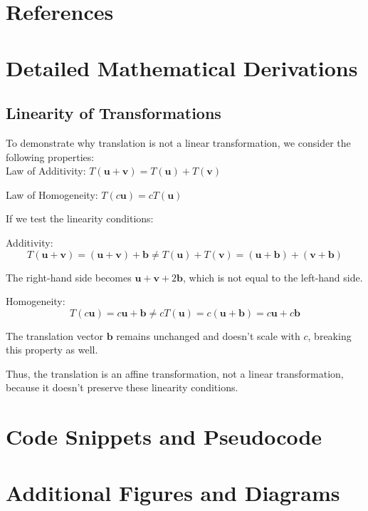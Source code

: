 \documentclass[12pt]{article}
\begin{document}
\section{References}
\label{sec:references}



\appendix
\section{Detailed Mathematical Derivations}
\label{sec:appendix-derivations}

\subsection{Linearity of Transformations}
\label{sec:appendix-derivations-linear}
To demonstrate why translation is not a linear transformation, we consider the following properties: \\

Law of Additivity: \( T(\mathbf{u} + \mathbf{v}) = T(\mathbf{u}) + T(\mathbf{v}) \)

Law of Homogeneity: \( T(c\mathbf{u}) = cT(\mathbf{u}) \)

If we test the linearity conditions:

Additivity:
\[
    T(\mathbf{u} + \mathbf{v}) = (\mathbf{u} + \mathbf{v}) + \mathbf{b} \neq T(\mathbf{u}) + T(\mathbf{v}) = (\mathbf{u} + \mathbf{b}) + (\mathbf{v} + \mathbf{b})
\]

The right-hand side becomes \( \mathbf{u} + \mathbf{v} + 2\mathbf{b} \), which is not equal to the left-hand side.

Homogeneity:
\[
    T(c\mathbf{u}) = c\mathbf{u} + \mathbf{b} \neq cT(\mathbf{u}) = c(\mathbf{u} + \mathbf{b}) = c\mathbf{u} + c\mathbf{b}
\]

The translation vector \( \mathbf{b} \) remains unchanged and doesn’t scale with \( c \), breaking this property as well.

Thus, the translation is an affine transformation, not a linear transformation, because it doesn’t preserve these linearity conditions.

\section{Code Snippets and Pseudocode}
\label{sec:appendix-code}

\section{Additional Figures and Diagrams}
\label{sec:appendix-figures}
\end{document}
